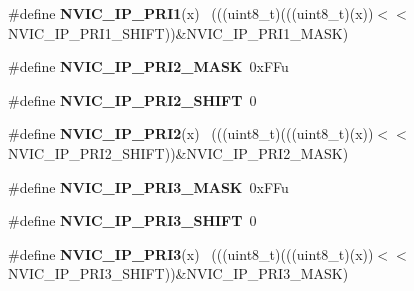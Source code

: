 \begin{DoxyCompactItemize}
\item 
\hypertarget{group___n_v_i_c___register___masks_ga73ed75f09fe08073eae04f2af5488c5f}{}\#define {\bfseries N\+V\+I\+C\+\_\+\+I\+P\+\_\+\+P\+R\+I1}(x)                                                ~(((uint8\+\_\+t)(((uint8\+\_\+t)(x))$<$$<$N\+V\+I\+C\+\_\+\+I\+P\+\_\+\+P\+R\+I1\+\_\+\+S\+H\+I\+F\+T))\&N\+V\+I\+C\+\_\+\+I\+P\+\_\+\+P\+R\+I1\+\_\+\+M\+A\+S\+K)\label{group___n_v_i_c___register___masks_ga73ed75f09fe08073eae04f2af5488c5f}

\item 
\hypertarget{group___n_v_i_c___register___masks_gacbb2835d54792f9f5e813ccc777ad715}{}\#define {\bfseries N\+V\+I\+C\+\_\+\+I\+P\+\_\+\+P\+R\+I2\+\_\+\+M\+A\+S\+K}~0x\+F\+Fu\label{group___n_v_i_c___register___masks_gacbb2835d54792f9f5e813ccc777ad715}

\item 
\hypertarget{group___n_v_i_c___register___masks_gabe9648efde49c592f41ddab5cd314b04}{}\#define {\bfseries N\+V\+I\+C\+\_\+\+I\+P\+\_\+\+P\+R\+I2\+\_\+\+S\+H\+I\+F\+T}~0\label{group___n_v_i_c___register___masks_gabe9648efde49c592f41ddab5cd314b04}

\item 
\hypertarget{group___n_v_i_c___register___masks_gaf19cd5f0754c394ef8d537ad00217c2a}{}\#define {\bfseries N\+V\+I\+C\+\_\+\+I\+P\+\_\+\+P\+R\+I2}(x)                                                ~(((uint8\+\_\+t)(((uint8\+\_\+t)(x))$<$$<$N\+V\+I\+C\+\_\+\+I\+P\+\_\+\+P\+R\+I2\+\_\+\+S\+H\+I\+F\+T))\&N\+V\+I\+C\+\_\+\+I\+P\+\_\+\+P\+R\+I2\+\_\+\+M\+A\+S\+K)\label{group___n_v_i_c___register___masks_gaf19cd5f0754c394ef8d537ad00217c2a}

\item 
\hypertarget{group___n_v_i_c___register___masks_ga4be2c7d4f279634219ceddcb881ea603}{}\#define {\bfseries N\+V\+I\+C\+\_\+\+I\+P\+\_\+\+P\+R\+I3\+\_\+\+M\+A\+S\+K}~0x\+F\+Fu\label{group___n_v_i_c___register___masks_ga4be2c7d4f279634219ceddcb881ea603}

\item 
\hypertarget{group___n_v_i_c___register___masks_ga5a4416c544f24934b29fc3f45e7ed14a}{}\#define {\bfseries N\+V\+I\+C\+\_\+\+I\+P\+\_\+\+P\+R\+I3\+\_\+\+S\+H\+I\+F\+T}~0\label{group___n_v_i_c___register___masks_ga5a4416c544f24934b29fc3f45e7ed14a}

\item 
\hypertarget{group___n_v_i_c___register___masks_gaf81ab6f754d1656c98582f7cf0573bae}{}\#define {\bfseries N\+V\+I\+C\+\_\+\+I\+P\+\_\+\+P\+R\+I3}(x)                                                ~(((uint8\+\_\+t)(((uint8\+\_\+t)(x))$<$$<$N\+V\+I\+C\+\_\+\+I\+P\+\_\+\+P\+R\+I3\+\_\+\+S\+H\+I\+F\+T))\&N\+V\+I\+C\+\_\+\+I\+P\+\_\+\+P\+R\+I3\+\_\+\+M\+A\+S\+K)\label{group___n_v_i_c___register___masks_gaf81ab6f754d1656c98582f7cf0573bae}


\end{DoxyCompactItemize}
